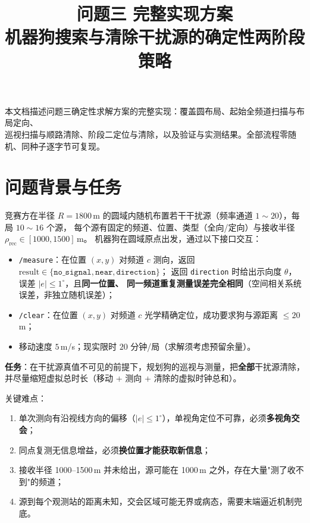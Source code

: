 \documentclass[a4paper,11pt]{ctexart}
\title{\bfseries 问题三 完整实现方案\\[4pt]
\large 机器狗搜索与清除干扰源的确定性两阶段策略}
\author{}
\date{}
\newcommand{\code}[1]{\texttt{#1}}
\begin{document}
\maketitle
\vspace{-2.5em}
\begin{center}
\small 本文档描述问题三确定性求解方案的完整实现：覆盖圆布局、起始全频道扫描与布局定向、\\[2pt]
巡视扫描与顺路清除、阶段二定位与清除，以及验证与实测结果。全部流程零随机、同种子逐字节可复现。
\end{center}

\tableofcontents
\newpage

\section{问题背景与任务}
竞赛方在半径 $R=1800$\,m 的圆域内随机布置若干干扰源（频率通道 $1\sim 20$），每局 $10\sim 16$ 个源，
每个源有固定的频道、位置、类型（全向/定向）与接收半径 $\rho_{\text{rec}}\in[1000,1500]$\,m。
机器狗在圆域原点出发，通过以下接口交互：
\begin{itemize}
  \item \code{/measure}：在位置 $(x,y)$ 对频道 $c$ 测向，返回
        $\text{result}\in\{\texttt{no\_signal},\texttt{near},\texttt{direction}\}$；
        返回 \texttt{direction} 时给出示向度 $\theta$，误差 $|e|\le 1^\circ$，且\textbf{同一位置、
        同一频道重复测量误差完全相同}（空间相关系统误差，非独立随机误差）；
  \item \code{/clear}：在位置 $(x,y)$ 对频道 $c$ 光学精确定位，成功要求狗与源距离 $\le 20$\,m；
  \item 移动速度 $5$\,m/s；现实限时 $20$ 分钟/局（求解须考虑预留余量）。
\end{itemize}

\textbf{任务}：在干扰源真值不可见的前提下，规划狗的巡视与测量，把\textbf{全部}干扰源清除，
并尽量缩短虚拟总时长（移动 + 测向 + 清除的虚拟时钟总和）。

关键难点：
\begin{enumerate}
  \item 单次测向有沿视线方向的偏移（$|e|\le1^\circ$），单视角定位不可靠，必须\textbf{多视角交会}；
  \item 同点复测无信息增益，必须\textbf{换位置才能获取新信息}；
  \item 接收半径 1000–1500\,m 并未给出，源可能在 1000\,m 之外，存在大量"测了收不到"的频道；
  \item 源到每个观测站的距离未知，交会区域可能无界或病态，需要末端逼近机制兜底。
\end{enumerate}
\end{document}
